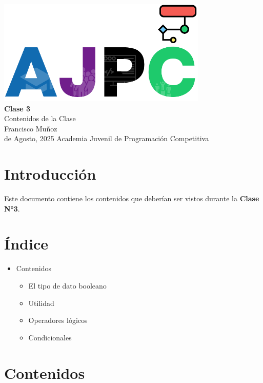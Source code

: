 \documentclass{article}
\newcommand{\documentTitle}{Clase 3}
\newcommand{\documentSubtitle}{Contenidos de la Clase}
\newcommand{\documentAuthor}{Francisco Muñoz}
\newcommand{\documentDate}{9 de Agosto, 2025}
\begin{document}
\thispagestyle{empty}
\AddToShipoutPictureBG*{}
\begin{center}
    \vspace*{2cm}
    \includegraphics[width=0.75\textwidth]{logo.png} \\[1.5cm]
    {\Huge \textbf{\documentTitle}} \\[0.5cm]
    {\Large \documentSubtitle} \\[1.5cm]
    {\large \documentAuthor} \\[0.5cm]
    {\large \space \space \documentDate}
    \vfill
    {\large Academia Juvenil de Programación Competitiva}
\end{center}
\newpage

\section{Introducción}

Este documento contiene los contenidos que deberían ser vistos durante la \textbf{Clase N°3}.

\section{Índice}

\begin{itemize}
    \item Contenidos
    \begin{itemize}
        \item El tipo de dato booleano
        \item Utilidad
        \item Operadores lógicos
        \item Condicionales
    \end{itemize}
\end{itemize}

\section{Contenidos}
\end{document}
